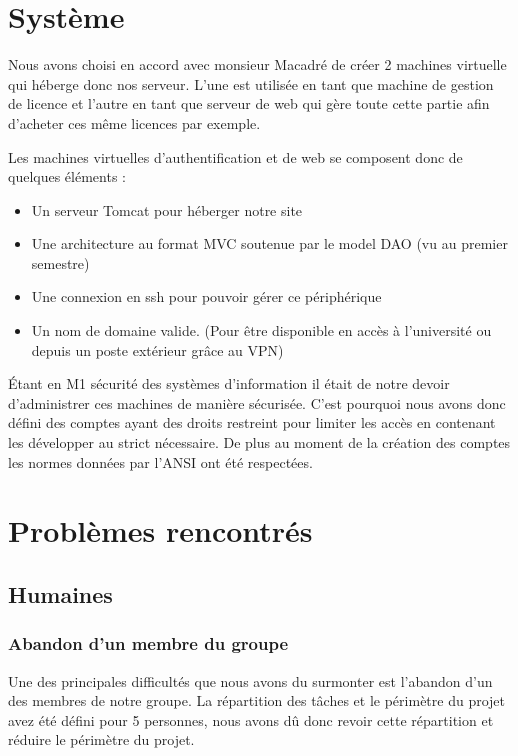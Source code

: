 \chapter{Système}

Nous avons choisi en accord avec monsieur Macadré de créer 2 machines virtuelle qui héberge donc nos serveur. L'une est utilisée en tant que machine de gestion de licence 
et l'autre en tant que serveur de web qui gère toute cette partie afin d'acheter ces même licences par exemple.\newline

Les machines virtuelles d'authentification et de web se composent donc de quelques éléments :\newline

\begin{itemize}
	\item Un serveur Tomcat pour héberger notre site
	\item Une architecture au format MVC soutenue par le model DAO (vu au premier semestre)
	\item Une connexion en ssh pour pouvoir gérer ce périphérique
	\item Un nom de domaine valide. (Pour être disponible en accès à l'université ou depuis un poste extérieur grâce au VPN)\newline
\end{itemize}

Étant en M1 sécurité des systèmes d'information il était de notre devoir d'administrer ces machines de manière sécurisée.
C'est pourquoi nous avons donc défini des comptes ayant des droits restreint pour limiter les accès en contenant les développer au strict nécessaire.
De plus au moment de la création des comptes les normes données par l'ANSI ont été respectées.

\chapter{Problèmes rencontrés}

\section{Humaines}

\subsection{Abandon d'un membre du groupe}

Une des principales difficultés que nous avons du surmonter est l'abandon d'un des membres de notre groupe. La répartition des tâches et le périmètre du projet avez été défini
pour 5 personnes, nous avons dû donc revoir cette répartition et réduire le périmètre du projet.

